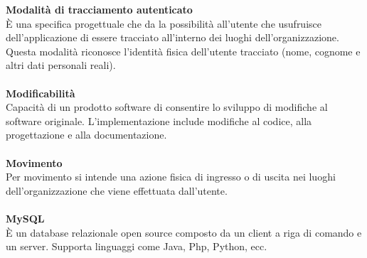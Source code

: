 \textbf{Modalità di tracciamento autenticato}\\
È una specifica progettuale che da la possibilità all’utente che usufruisce dell’applicazione di essere tracciato all'interno dei luoghi dell'organizzazione. Questa modalità riconosce l'identità fisica dell'utente tracciato (nome, cognome e altri dati personali reali). \\ \\
\textbf{Modificabilità}\\
Capacità di un prodotto software di consentire lo sviluppo di modifiche al software originale. L'implementazione include modifiche al codice, alla progettazione e alla documentazione.\\ \\
\textbf{Movimento}\\
Per movimento si intende una azione fisica di ingresso o di uscita nei luoghi dell'organizzazione che viene effettuata dall'utente. \\ \\
\textbf{MySQL}\\
È un database relazionale open source composto da un client a riga di comando e un server. Supporta linguaggi come Java, Php, Python, ecc. \\ \\
\clearpage
